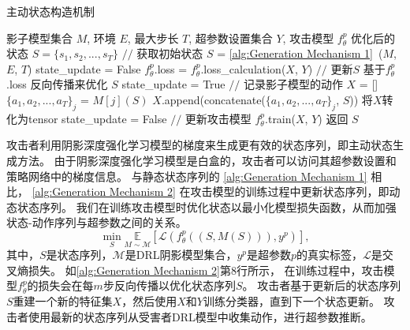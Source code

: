 \begin{algorithm}[!t]
    \caption{主动状态构造机制}
    \label{alg:Generation Mechanism 2}
    \begin{algorithmic}[1]
    \REQUIRE 影子模型集合 $M$, 环境 $E$, 最大步长 $T$, 超参数设置集合 $Y$, 攻击模型 $f_{\theta}^{p}$
    \ENSURE 优化后的状态 $S = \{s_1, s_2, ..., s_T\}$
    \STATE $//$ 获取初始状态
    \STATE $S$ = \autoref{alg:Generation Mechanism 1}~($M$, $E$, $T$)
    \STATE state\_update = False
    \STATE $f_{\theta}^{p}$.loss = $f_{\theta}^{p}$.loss\_calculation($X$, $Y$)
    \STATE $//$ 更新$S$
    \STATE 基于$f_{\theta}^{p}$.loss 反向传播来优化 $S$
    \STATE state\_update = True
    \ENDIF
    \STATE $//$ 记录影子模型的动作
    \STATE $X$ = []
    \STATE $\{a_1, a_2, ..., a_T\}_j$ = $M[j](S)$
    \STATE $X$.append(concatenate($\{a_1, a_2, ..., a_T\}_j$, $S$))
    \STATE 将$X$转化为tensor
    \ENDFOR
    \STATE state\_update = False
    \ENDIF
    \STATE $//$ 更新攻击模型
    \STATE $f_{\theta}^{p}$.train($X$, $Y$)
    \ENDFOR
    \STATE 返回 $S$
    \end{algorithmic}
\end{algorithm}
攻击者利用阴影深度强化学习模型的梯度来生成更有效的状态序列，即主动状态生成方法。
由于阴影深度强化学习模型是白盒的，攻击者可以访问其超参数设置和策略网络中的梯度信息。
与静态状态序列的 \autoref{alg:Generation Mechanism 1} 相比，
\autoref{alg:Generation Mechanism 2} 在攻击模型的训练过程中更新状态序列，即动态状态序列。
我们在训练攻击模型时优化状态以最小化模型损失函数，从而加强状态-动作序列与超参数之间的关系。
\begin{equation}
    \min _{S} \underset{M \sim \mathcal{M}}{\mathbb{E}}\left[ \mathcal{L}\left(f_{\theta}^{p}\left(\left(S, M\left(S\right)\right)\right), y^{p}\right)\right], 
\end{equation}
其中，$S$是状态序列，$\mathcal{M}$是DRL阴影模型集合，$y^{p}$是超参数$p$的真实标签，$\mathcal{L}$是交叉熵损失。
如\autoref{alg:Generation Mechanism 2}第8行所示，
在训练过程中，攻击模型$f_{\theta}^{p}$的损失会在每$m$步反向传播以优化状态序列$S$。
攻击者基于更新后的状态序列$S$重建一个新的特征集$X$，然后使用$X$和$Y$训练分类器，直到下一个状态更新。
攻击者使用最新的状态序列从受害者DRL模型中收集动作，进行超参数推断。

